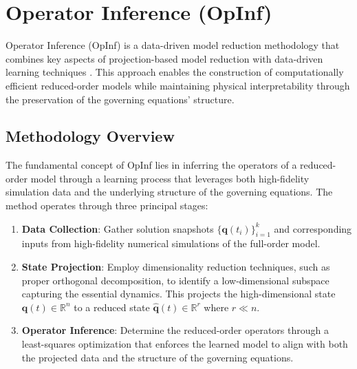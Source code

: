 
\section{Operator Inference (OpInf)}
\label{sec:operator_inference}


Operator Inference (OpInf) is a data-driven model reduction methodology that combines key aspects of projection-based model reduction with data-driven learning techniques \cite{kramer2024learning,peherstorfer2016data}. This approach enables the construction of computationally efficient reduced-order models while maintaining physical interpretability through the preservation of the governing equations' structure.

\subsection*{Methodology Overview}
The fundamental concept of OpInf lies in inferring the operators of a reduced-order model through a learning process that leverages both high-fidelity simulation data and the underlying structure of the governing equations. The method operates through three principal stages:

\begin{enumerate}
    \item \textbf{Data Collection}: Gather solution snapshots $\{ \mathbf{q}(t_i) \}_{i=1}^{k}$ and corresponding inputs from high-fidelity numerical simulations of the full-order model.
    
    \item \textbf{State Projection}: Employ dimensionality reduction techniques, such as proper orthogonal decomposition, to identify a low-dimensional subspace capturing the essential dynamics. This projects the high-dimensional state $\mathbf{q}(t) \in \mathbb{R}^n$ to a reduced state $\hat{\mathbf{q}}(t) \in \mathbb{R}^r$ where $r \ll n$.
    
    \item \textbf{Operator Inference}: Determine the reduced-order operators through a least-squares optimization that enforces the learned model to align with both the projected data and the structure of the governing equations.
\end{enumerate}

